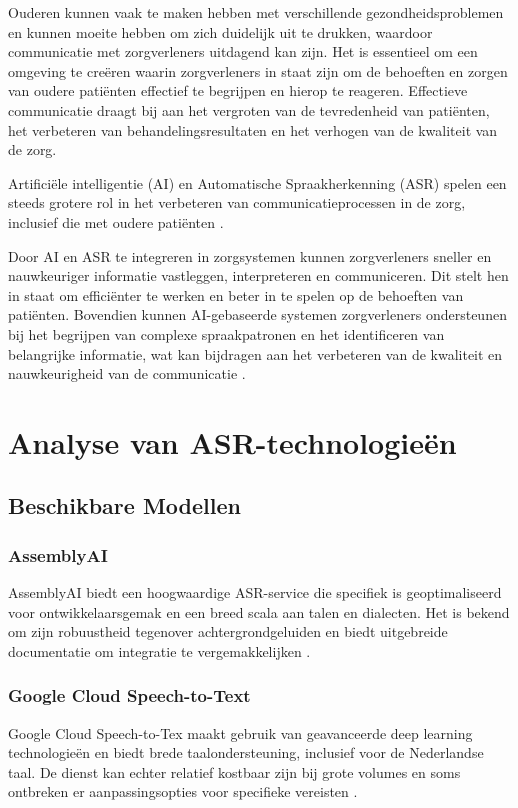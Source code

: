 Ouderen kunnen vaak te maken hebben met verschillende gezondheidsproblemen en kunnen moeite hebben om zich duidelijk uit te drukken, waardoor communicatie met zorgverleners uitdagend kan zijn. Het is essentieel om een ​​omgeving te creëren waarin zorgverleners in staat zijn om de behoeften en zorgen van oudere patiënten effectief te begrijpen en hierop te reageren. Effectieve communicatie draagt bij aan het vergroten van de tevredenheid van patiënten, het verbeteren van behandelingsresultaten en het verhogen van de kwaliteit van de zorg.

Artificiële intelligentie (AI) en Automatische Spraakherkenning (ASR) spelen een steeds grotere rol in het verbeteren van communicatieprocessen in de zorg, inclusief die met oudere patiënten \autocite{patel2019}. 

Door AI en ASR te integreren in zorgsystemen kunnen zorgverleners sneller en nauwkeuriger informatie vastleggen, interpreteren en communiceren. Dit stelt hen in staat om efficiënter te werken en beter in te spelen op de behoeften van patiënten. Bovendien kunnen AI-gebaseerde systemen zorgverleners ondersteunen bij het begrijpen van complexe spraakpatronen en het identificeren van belangrijke informatie, wat kan bijdragen aan het verbeteren van de kwaliteit en nauwkeurigheid van de communicatie \autocite{patel2019}. 
\section{Analyse van ASR-technologieën}

\subsection{Beschikbare Modellen}

\subsubsection{AssemblyAI}
AssemblyAI biedt een hoogwaardige ASR-service die specifiek is geoptimaliseerd voor ontwikkelaarsgemak en een breed scala aan talen en dialecten. Het is bekend om zijn robuustheid tegenover achtergrondgeluiden en biedt uitgebreide documentatie om integratie te vergemakkelijken \autocite{assemblyai2024}.

\subsubsection{Google Cloud Speech-to-Text }
Google Cloud Speech-to-Tex maakt gebruik van geavanceerde deep learning technologieën en biedt brede taalondersteuning, inclusief voor de Nederlandse taal. De dienst kan echter relatief kostbaar zijn bij grote volumes en soms ontbreken er aanpassingsopties voor specifieke vereisten \autocite{googleasr2024}.

